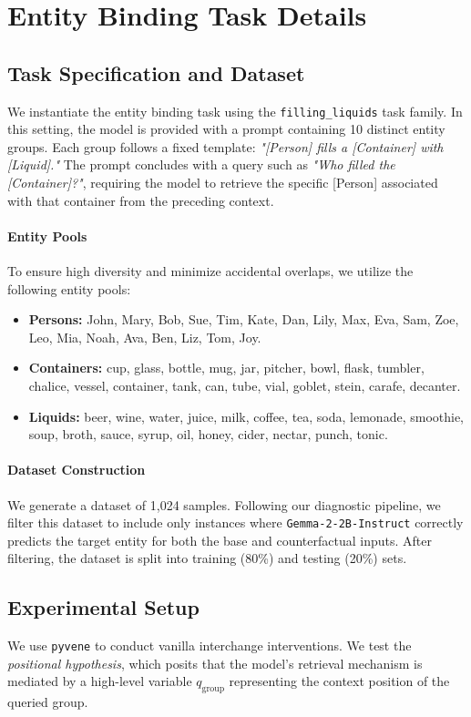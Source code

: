 \section{Entity Binding Task Details}

\subsection{Task Specification and Dataset}
We instantiate the entity binding task using the \texttt{filling\_liquids} task family. In this setting, the model is provided with a prompt containing 10 distinct entity groups. Each group follows a fixed template: \textit{"[Person] fills a [Container] with [Liquid]."} The prompt concludes with a query such as \textit{"Who filled the [Container]?"}, requiring the model to retrieve the specific [Person] associated with that container from the preceding context.

\paragraph{Entity Pools} To ensure high diversity and minimize accidental overlaps, we utilize the following entity pools:
\begin{itemize}
    \item \textbf{Persons:} John, Mary, Bob, Sue, Tim, Kate, Dan, Lily, Max, Eva, Sam, Zoe, Leo, Mia, Noah, Ava, Ben, Liz, Tom, Joy.
    \item \textbf{Containers:} cup, glass, bottle, mug, jar, pitcher, bowl, flask, tumbler, chalice, vessel, container, tank, can, tube, vial, goblet, stein, carafe, decanter.
    \item \textbf{Liquids:} beer, wine, water, juice, milk, coffee, tea, soda, lemonade, smoothie, soup, broth, sauce, syrup, oil, honey, cider, nectar, punch, tonic.
\end{itemize}

\paragraph{Dataset Construction} We generate a dataset of 1,024 samples. Following our diagnostic pipeline, we filter this dataset to include only instances where \texttt{Gemma-2-2B-Instruct} correctly predicts the target entity for both the base and counterfactual inputs. After filtering, the dataset is split into training (80\%) and testing (20\%) sets.

\subsection{Experimental Setup}
We use \texttt{pyvene} to conduct vanilla interchange interventions. We test the \textit{positional hypothesis}, which posits that the model's retrieval mechanism is mediated by a high-level variable $q_{\mathrm{group}}$ representing the context position of the queried group. 


